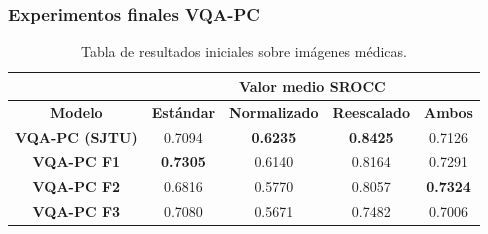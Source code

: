 \begin{frame}
  \frametitle{Experimentos finales VQA-PC}
\begin{table}[htp]
  \small
  \centering
\begin{tabular}{|c|cccc|}
\hline
\rowcolor[HTML]{FFC702}
                       & \multicolumn{4}{c|}{\textbf{Valor medio SROCC}}                                                                                                    \\ \hline
\rowcolor[HTML]{FFC702}
\textbf{Modelo}        & \multicolumn{1}{c|}{\textbf{Estándar}} & \multicolumn{1}{c|}{\textbf{Normalizado}} & \multicolumn{1}{c|}{\textbf{Reescalado}} & \textbf{Ambos}  \\ \hline
\textbf{VQA-PC (SJTU)} & \multicolumn{1}{c|}{0.7094}            & \multicolumn{1}{c|}{\textbf{0.6235}}      & \multicolumn{1}{c|}{\textbf{0.8425}}    & 0.7126          \\ \hline
\textbf{VQA-PC F1}     & \multicolumn{1}{c|}{\textbf{0.7305}}   & \multicolumn{1}{c|}{0.6140}               & \multicolumn{1}{c|}{0.8164}             & 0.7291          \\ \hline
\textbf{VQA-PC F2}     & \multicolumn{1}{c|}{0.6816}            & \multicolumn{1}{c|}{0.5770}               & \multicolumn{1}{c|}{0.8057}             & \textbf{0.7324} \\ \hline
\textbf{VQA-PC F3}     & \multicolumn{1}{c|}{0.7080}            & \multicolumn{1}{c|}{0.5671}      & \multicolumn{1}{c|}{0.7482}             & 0.7006          \\ \hline
\end{tabular}
\caption[Valor medio sobre imágenes médicas.]{Tabla de resultados iniciales sobre imágenes médicas.}
\label{tab:SroccMedRes}
\end{table}
\end{frame}

